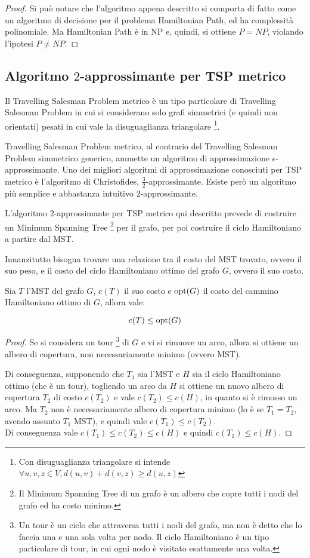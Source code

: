 \begin{proof}
    Si può notare che l'algoritmo appena descritto si comporta di fatto come
    un algoritmo di decisione per il problema Hamiltonian Path,
    ed ha complessità polinomiale.
    Ma Hamiltonian Path è in NP e, quindi, si ottiene $P = NP$,
    violando l'ipotesi $P \neq NP$.
\end{proof}


\subsection{Algoritmo $2$-approssimante per TSP metrico}
Il Travelling Salesman Problem metrico è un tipo particolare di Travelling
Salesman Problem in cui si considerano solo grafi simmetrici
(e quindi non orientati) pesati in cui vale la disuguaglianza triangolare
\footnote{Con disuguaglianza triangolare si intende
$\forall u, v, z \in V, d(u,v) + d(v,z) \ge d(u,z)$}.

Travelling Salesman Problem metrico, al contrario del Travelling Salesman
Problem simmetrico generico, ammette un algoritmo di approssimazione
$\epsilon$-approssimante. Uno dei migliori algoritmi di approssimazione
conosciuti per TSP metrico è l'algoritmo di Christofides,
$\frac{3}{2}$-approssimante.
Esiste però un algoritmo più semplice e abbastanza intuitivo
$2$-approssimante.

L'algoritmo $2$-approssimante per TSP metrico qui descritto prevede di
costruire un Minimum Spanning Tree \footnote{Il Minimum Spanning Tree di
un grafo è un albero che copre tutti i nodi del grafo ed ha costo minimo.}
per il grafo, per poi costruire il ciclo Hamiltoniano a partire dal MST.

Innanzitutto bisogna trovare una relazione tra il costo del MST trovato,
ovvero il suo peso, e il costo del ciclo Hamiltoniano ottimo del grafo $G$,
ovvero il suo costo.
\begin{thm}
    Sia $T$ l'MST del grafo $G$, $c(T)$ il suo costo e $\textnormal{opt}(G)$ il costo
    del cammino Hamiltoniano ottimo di $G$, allora vale:
\end{thm}
\[
    c(T) \le \textnormal{opt}(G)
\]
\begin{proof}
    Se si considera un tour \footnote{Un tour è un ciclo che attraversa
    tutti i nodi del grafo, ma non è detto che lo faccia una e una sola
    volta per nodo. Il ciclo Hamiltoniano è un tipo particolare di tour,
    in cui ogni nodo è visitato esattamente una volta.} di $G$ e vi si
    rimuove un arco, allora si ottiene un albero di copertura, non
    necessariamente minimo (ovvero MST).

    Di conseguenza, supponendo che $T_1$ sia l'MST e $H$ sia il ciclo
    Hamiltoniano ottimo (che è un tour), togliendo un arco da $H$ si
    ottiene un nuovo albero di copertura $T_2$ di costo $c(T_2)$ e vale
    $c(T_2) \le c(H)$, in quanto si è rimosso un arco. Ma $T_2$ non è
    necessariamente albero di copertura minimo (lo è se $T_1 = T_2$,
    avendo assunto $T_1$ MST), e quindi vale $c(T_1) \le c(T_2)$.\\
    Di conseguenza vale $c(T_1) \le c(T_2) \le c(H)$ e quindi $c(T_1) \le c(H)$.
\end{proof}


